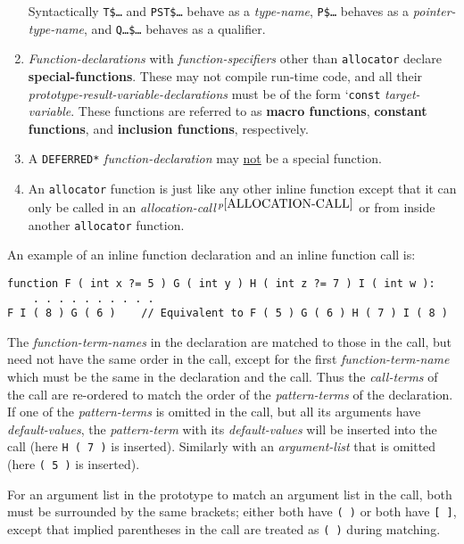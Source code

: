 \documentclass[12pt]{article}
\newcommand{\skey}[2]{{\rm \bfseries #1#2}}
\newcommand{\pagnote}[1]{$\,^{p\pageref{#1}}$}
\newenvironment{indpar}[1][0.3in]%
	{\begin{list}{}%
		     {\setlength{\itemsep}{0in}%
		      \setlength{\topsep}{0in}%
		      \setlength{\parsep}{1ex}%
		      \setlength{\labelwidth}{#1}%
		      \setlength{\leftmargin}{#1}%
		      \addtolength{\leftmargin}{\labelsep}}%
	 \item}%
	{\end{list}}
\begin{document}
\begin{enumerate}
Syntactically {\tt T\$\ldots} and {\tt PST\$\ldots} behave as
a {\em type-name},
{\tt P\$\ldots} behaves as a {\em pointer-type-name},
and {\tt Q\ldots\$\ldots} behaves as a qualifier.
\item
{\em Function-declarations} with {\em function-specifiers} other
than {\tt allocator} declare
\skey{special-function}s.  These may not compile run-time code,
and all their {\em prototype-result-variable-declarations}
must be of the form `{\tt const} {\em target-variable}.
These functions are referred to as \skey{macro function}s,
\skey{constant function}s, and \skey{inclusion function}s, respectively.
\item
A {\tt *DEFERRED*} {\em function-declaration} may \underline{not} be
a special function.
\item
An {\tt allocator} function\label{ALLOCATOR-FUNCTION}
is just like any other inline function
except that it can only be called in
an {\em allocation-call}\pagnote{ALLOCATION-CALL}
or from inside another {\tt allocator} function.

\end{enumerate}

An example of an inline function declaration and an inline function call is:
\begin{indpar}\begin{verbatim}
function F ( int x ?= 5 ) G ( int y ) H ( int z ?= 7 ) I ( int w ):
    . . . . . . . . . .
F I ( 8 ) G ( 6 )    // Equivalent to F ( 5 ) G ( 6 ) H ( 7 ) I ( 8 )
\end{verbatim}\end{indpar}

The {\em function-term-names} in the declaration are matched to those
in the call, but need not have the same order in the call, except for
the first {\em function-term-name} which must be the same in the
declaration and the call.  Thus the {\em call-terms} of the call
are re-ordered to match the order of the {\em pattern-terms} of the
declaration.  If one of the {\em pattern-terms} is omitted in the
call, but all its arguments have {\em default-values},
the {\em pattern-term} with its
{\em default-values} will be inserted into the call
(here {\tt H ( 7 )} is inserted).
Similarly with an {\em argument-list} that is omitted
(here {\tt ( 5 )} is inserted).

For an argument
list in the prototype to match an argument list in the call, both
must be surrounded by the same brackets; either both have {\tt (~)}
or both have {\tt [~]}, except that implied parentheses in the
call are treated as {\tt (~)} during matching.
\end{document}
